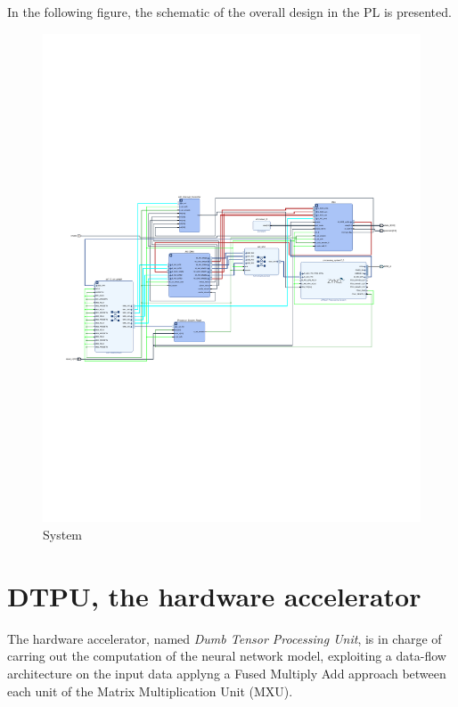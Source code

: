 \newpage
In the following figure, the schematic of the overall design in the PL is presented.
\begin{figure}[!htbp]
\centering
\captionsetup{justification=centering}
\includegraphics[scale=1,angle=90]{./figure/system_schematic.pdf}
\caption{System}
\label{fig:sys}
\end{figure}

\section{DTPU, the hardware accelerator}
The hardware accelerator, named \textit{ Dumb Tensor Processing Unit}, is in charge of carring out the computation of the neural network model, exploiting a data-flow architecture on the input data applyng a Fused Multiply Add approach between each unit of the Matrix Multiplication Unit (MXU).

